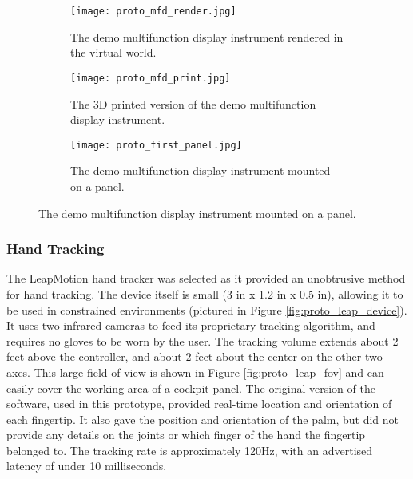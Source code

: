 \begin{figure}
    \centering
    \begin{subfigure}[t]{0.32\linewidth}
        \centering
        \texttt{[image: proto\_mfd\_render.jpg]}
        \caption{The demo multifunction display instrument rendered in the virtual world.}
        \label{fig:proto_mfd_render}
    \end{subfigure}
    \begin{subfigure}[t]{0.32\linewidth}
        \centering
        \texttt{[image: proto\_mfd\_print.jpg]}
        \caption{The 3D printed version of the demo multifunction display instrument.}
        \label{fig:proto_mfd_print}
    \end{subfigure}
    \begin{subfigure}[t]{0.32\linewidth}
        \centering
        \texttt{[image: proto\_first\_panel.jpg]}
        \caption{The demo multifunction display instrument mounted on a panel.}
        \label{fig:proto_first_panel}
    \end{subfigure}
\end{figure}


\subsubsection{Hand Tracking}

The LeapMotion hand tracker was selected as it provided an unobtrusive method for hand tracking.
The device itself is small (3 in x 1.2 in x 0.5 in), allowing it to be used in constrained environments (pictured in Figure \ref{fig:proto_leap_device}).
It uses two infrared cameras to feed its proprietary tracking algorithm, and requires no gloves to be worn by the user.
The tracking volume extends about 2 feet above the controller, and about 2 feet about the center on the other two axes.
This large field of view is shown in Figure \ref{fig:proto_leap_fov} and can easily cover the working area of a cockpit panel.
The original version of the software, used in this prototype, provided real-time location and orientation of each fingertip.
It also gave the position and orientation of the palm, but did not provide any details on the joints or which finger of the hand the fingertip belonged to.
The tracking rate is approximately 120Hz, with an advertised latency of under 10 milliseconds.

